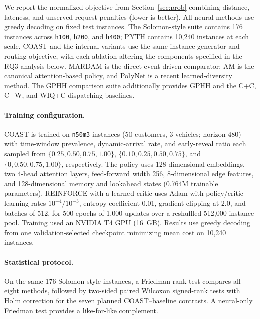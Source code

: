 \documentclass[letterpaper]{article}
\begin{document}
We report the normalized objective from Section~\ref{sec:prob} combining distance, lateness, and unserved-request penalties (lower is better). All neural methods use greedy decoding on fixed test instances. The Solomon-style suite \cite{solomon1987algorithms} contains 176 instances across \texttt{h100}, \texttt{h200}, and \texttt{h400}; PYTH contains 10,240 instances at each scale. COAST and the internal variants use the same instance generator and routing objective, with each ablation altering the components specified in the RQ3 analysis below. MARDAM \cite{bono2021mardam} is the direct event-driven comparator; AM \cite{kool2019attention} is the canonical attention-based policy, and PolyNet \cite{hottung2025polynet} is a recent learned-diversity method. The GPHH comparison suite \cite{TAM2026114234} additionally provides GPHH and the C+C, C+W, and WIQ+C dispatching baselines.

\paragraph{Training configuration.}
COAST is trained on \texttt{n50m3} instances (50 customers, 3 vehicles; horizon 480) with time-window prevalence, dynamic-arrival rate, and early-reveal ratio each sampled from $\{0.25,0.50,0.75,1.00\}$, $\{0.10,0.25,0.50,0.75\}$, and $\{0,0.50,0.75,1.00\}$, respectively. The policy uses 128-dimensional embeddings, two 4-head attention layers, feed-forward width 256, 8-dimensional edge features, and 128-dimensional memory and lookahead states (0.764M trainable parameters). REINFORCE with a learned critic uses Adam with policy/critic learning rates $10^{-4}/10^{-3}$, entropy coefficient 0.01, gradient clipping at 2.0, and batches of 512, for 500 epochs of 1,000 updates over a reshuffled 512,000-instance pool. Training used an NVIDIA T4 GPU (16~GB). Results use greedy decoding from one validation-selected checkpoint minimizing mean cost on 10,240 instances.

\paragraph{Statistical protocol.}
On the same 176 Solomon-style instances, a Friedman rank test \cite{friedman1937ranks} compares all eight methods, followed by two-sided paired Wilcoxon signed-rank tests \cite{wilcoxon1945ranking} with Holm correction \cite{holm1979sequential} for the seven planned COAST--baseline contrasts. A neural-only Friedman test provides a like-for-like complement.
\end{document}

